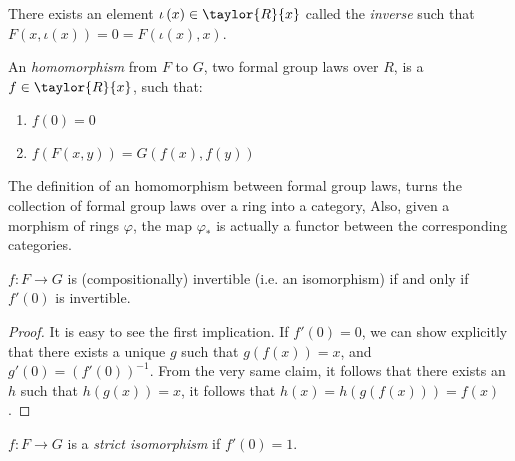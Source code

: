 \begin{lemma*}
	There exists an element $\iota\left(x\right) \in \taylor{R}{x}$ called the \emph{inverse} such that
	$
		F\left(x,\iota\left(x\right)\right)
		= 0
		= F\left(\iota\left(x\right),x\right)
	$.
\end{lemma*}

\begin{definition*}
	An \emph{homomorphism} from $F$ to $G$, two formal group laws over $R$, is a $f \in \taylor{R}{x}$, such that:
	\begin{enumerate}
		\item $f\left(0\right) = 0$
		\item $f\left(F\left(x,y\right)\right) = G\left(f\left(x\right),f\left(y\right)\right)$
	\end{enumerate}
\end{definition*}

\begin{remark*}
	The definition of an homomorphism between formal group laws, turns the collection of formal group laws over a ring into a category,
	Also, given a morphism of rings $\varphi$, the map $\varphi_*$ is actually a functor between the corresponding categories.
\end{remark*}

\begin{lemma*}
	$f: F \to G$ is (compositionally) invertible (i.e. an isomorphism) if and only if $f'\left(0\right)$ is invertible.
\end{lemma*}

\begin{proof}
	It is easy to see the first implication.
	If $f'\left(0\right) = 0$, we can show explicitly that there exists a unique $g$ such that $g\left(f\left(x\right)\right) = x$, and $g'\left(0\right) = \left(f'\left(0\right)\right)^{-1}$. From the very same claim, it follows that there exists an $h$ such that $h\left(g\left(x\right)\right) = x$, it follows that $h\left(x\right) = h\left(g\left(f\left(x\right)\right)\right) = f\left(x\right)$.
\end{proof}

\begin{definition*}
	$f: F \to G$ is a \emph{strict isomorphism} if $f'\left(0\right)=1$.
\end{definition*}

